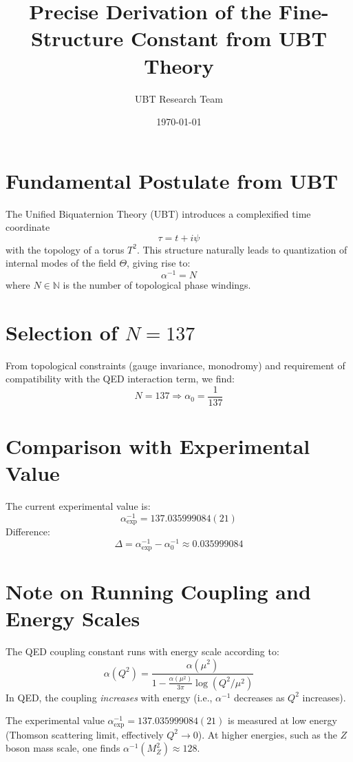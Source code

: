 \documentclass[12pt, a4paper]{article}
\title{Precise Derivation of the Fine-Structure Constant from UBT Theory}
\author{UBT Research Team}
\date{\today}
\begin{document}
\maketitle

\section{Fundamental Postulate from UBT}

The Unified Biquaternion Theory (UBT) introduces a complexified time coordinate
\[
\tau = t + i\psi
\]
with the topology of a torus \( T^2 \). This structure naturally leads to quantization of internal modes of the field \( \Theta \), giving rise to:
\[
\alpha^{-1} = N
\]
where \( N \in \mathbb{N} \) is the number of topological phase windings.

\section{Selection of \( N = 137 \)}

From topological constraints (gauge invariance, monodromy) and requirement of compatibility with the QED interaction term, we find:
\[
N = 137 \Rightarrow \alpha_0 = \frac{1}{137}
\]

\section{Comparison with Experimental Value}

The current experimental value is:
\[
\alpha_{\text{exp}}^{-1} = 137.035999084(21)
\]
Difference:
\[
\Delta = \alpha_{\text{exp}}^{-1} - \alpha_0^{-1} \approx 0.035999084
\]

\section{Note on Running Coupling and Energy Scales}

The QED coupling constant runs with energy scale according to:
\[
\alpha(Q^2) = \frac{\alpha(\mu^2)}{1 - \frac{\alpha(\mu^2)}{3\pi} \log(Q^2/\mu^2)}
\]
In QED, the coupling \emph{increases} with energy (i.e., $\alpha^{-1}$ decreases as $Q^2$ increases).

The experimental value $\alpha_{\text{exp}}^{-1} = 137.035999084(21)$ is measured at low energy (Thomson scattering limit, effectively $Q^2 \to 0$). At higher energies, such as the $Z$ boson mass scale, one finds $\alpha^{-1}(M_Z^2) \approx 128$.
\end{document}
